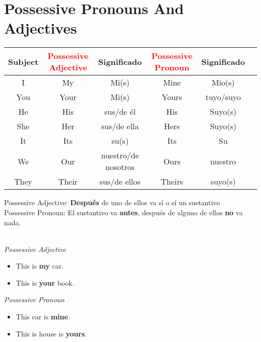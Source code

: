 \documentclass{elegantbook}
\begin{document}
    \section{Possessive Pronouns And Adjectives}
        \begin{tabular}{|c|c|c|c|c|c}
            \hline
            \textbf{Subject}&\textcolor{red}{\textbf{Possessive Adjective}}&\textbf{Significado}&\textcolor{red}{\textbf{Possessive Pronoun}}&\textbf{Significado}\\
            \hline
            I&My&Mi(s)&Mine&Mio(s)\\
            You&Your&Mi(s)&Yours&tuyo/suyo\\
            He&His&sus/de él&His&Suyo(s)\\
            She&Her&sus/de ella&Hers&Suyo(s)\\
            It&Its&su(s)&Its&Su\\
            We&Our&nuestro/de nosotros&Ours&nuestro\\
            They&Their&sus/de ellos&Theirs&suyo(s)\\
            \hline
        \end{tabular}
        \begin{corollary}{}{}
            Possessive Adjective: \textbf{Después} de uno de ellos va sí o sí un sustantivo\\
            Possessive Pronoun: El sustantivo va \textbf{antes}, después de alguno de ellos \textbf{no} va nada.
        \end{corollary}
        \begin{example}\\
            \textsl{Possessive Adjective}
            \begin{itemize}
                \item This is \textbf{my} car.
                \item This is \textbf{your} book.
            \end{itemize}
            \textsl{Possessive Pronoun}
            \begin{itemize}
                \item This car is \textbf{mine}.
                \item This is house is \textbf{yours}.
            \end{itemize}
        \end{example}
\end{document}
